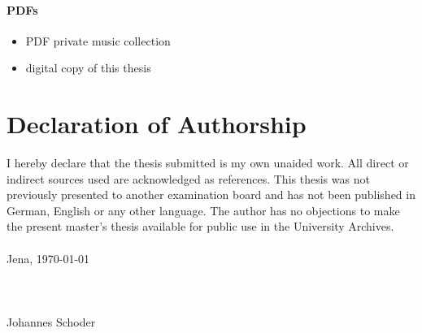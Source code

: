 \documentclass[a4paper,oneside,12pt]{report}
\begin{document}
\subsubsection{PDFs}

\begin{itemize}
	\setlength\itemsep{-0.5em}
	\item PDF private music collection
	\item digital copy of this thesis
\end{itemize}


\chapter*{Declaration of Authorship}

I hereby declare that the thesis submitted is my own unaided work. All direct or indirect
sources used are acknowledged as references.
This thesis was not previously presented to another examination board and has not been
published in German, English or any other language. The author has no objections to make the present master's thesis available for public use in the University Archives.\\
\ \\
Jena, \today
\ \\
\ \\
\ \\
\ \\
Johannes Schoder
\end{document}
